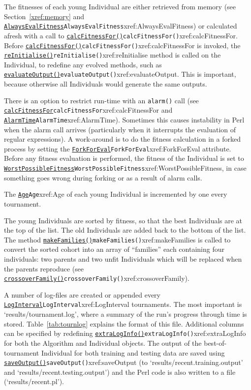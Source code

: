 \documentclass[a4paper]{article}
\begin{document}
The fitnesses of each young Individual are either retrieved from
memory (see Section~\ref{xref:memory} and \hyperref[no]{\texttt{AlwaysEvalFitness}}{\texttt{AlwaysEvalFitness}}{xref:AlwaysEvalFitness}) or
calculated afresh with a call to \hyperref[no]{\texttt{calcFitnessFor()}}{\texttt{calcFitnessFor()}}{xref:calcFitnessFor}.  Before
\hyperref[no]{\texttt{calcFitnessFor()}}{\texttt{calcFitnessFor()}}{xref:calcFitnessFor} is invoked, the \hyperref[no]{\texttt{reInitialise()}}{\texttt{reInitialise()}}{xref:reInitialise}
method is called on the Individual, to redefine any evolved methods,
such as \hyperref[no]{\texttt{evaluateOutput()}}{\texttt{evaluateOutput()}}{xref:evaluateOutput}.  This is important, because
otherwise all Individuals would generate the same outputs.

There is an option to restrict run-time with an \texttt{alarm()} call
(see \hyperref[no]{\texttt{calcFitnessFor}}{\texttt{calcFitnessFor}}{xref:calcFitnessFor} and \hyperref[no]{\texttt{AlarmTime}}{\texttt{AlarmTime}}{xref:AlarmTime}).  Sometimes this
causes instability in Perl when the alarm call arrives (particularly
when it interrupts the evaluation of regular expressions).  A
work-around is to do the fitness calculation in a forked process by
setting the \hyperref[no]{\texttt{ForkForEval}}{\texttt{ForkForEval}}{xref:ForkForEval} attribute.  Before any fitness
evaluation is performed, the fitness of the Individual is set to
\hyperref[no]{\texttt{WorstPossibleFitness}}{\texttt{WorstPossibleFitness}}{xref:WorstPossibleFitness}, in case something goes wrong during
forking or as a result of alarm calls.

The \hyperref[no]{\texttt{Age}}{\texttt{Age}}{xref:Age} of each young Individual is incremented by one every
tournament.

The young Individuals are sorted by fitness, so that the best
Individuals are at the top of the list.  The old Individuals are
added back to the bottom of the list.  The method
\hyperref[no]{\texttt{makeFamilies()}}{\texttt{makeFamilies()}}{xref:makeFamilies} is called to convert the sorted cohort into an
array of ``families'' each containing four individuals: two parents
and two unfit Individuals which will be replaced when the parents
reproduce (see \hyperref[no]{\texttt{crossoverFamily()}}{\texttt{crossoverFamily()}}{xref:crossoverFamily}).


A number of log-files are created or appended every
\hyperref[no]{\texttt{LogInterval}}{\texttt{LogInterval}}{xref:LogInterval} tournaments.  The most important is
`results/tournament.log', where a summary of the run's progress
through time is stored.  Table~\ref{tab:tournlog} explains the format
of this file.  Additional columns can be specified by redefining
\hyperref[no]{\texttt{extraLogInfo()}}{\texttt{extraLogInfo()}}{xref:extraLogInfo} for both the Algorithm and Individual objects.
The output of the best-of-tournament Individual for both training and
testing data are saved using \hyperref[no]{\texttt{saveOutput()}}{\texttt{saveOutput()}}{xref:saveOutput} (to
`results/recent.training.output' and `results/recent.testing.output')
and the Perl code is also written to a file (`results/recent.pl').
\end{document}
